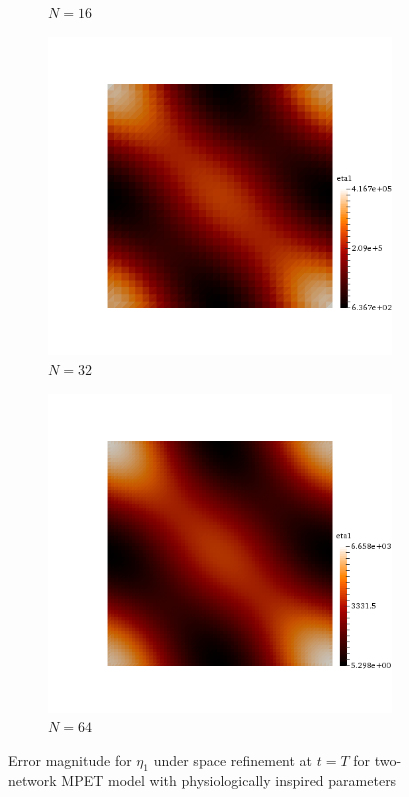 \begin{figure}[h!]
\begin{subfigure}[b]{0.24\textwidth}
    \caption{$N=16$}
  \end{subfigure}
  \begin{subfigure}[b]{0.24\textwidth}
    \includegraphics[width=\textwidth,height=\textheight,keepaspectratio,height=\textheight,keepaspectratio]{figures/2_mpet/biomedical/space/eta1_32.png}
    \caption{$N=32$}
  \end{subfigure}
  \begin{subfigure}[b]{0.24\textwidth}
    \includegraphics[width=\textwidth,height=\textheight,keepaspectratio,height=\textheight,keepaspectratio]{figures/2_mpet/biomedical/space/eta1_64.png}
    \caption{$N=64$}
  \end{subfigure}
  \caption{Error magnitude for $\eta_1$ under space refinement at $t=T$ for two-network MPET model with physiologically inspired parameters} \label{fig:bb_bio_eta1}
\end{figure}

